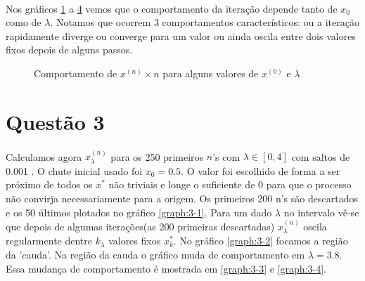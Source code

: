 \documentclass[a4paper,11pt]{article}
\begin{document}
\paragraph{}Nos gráficos \ref{graph:2-2-1} a \ref{graph:2-2-3} vemos que o comportamento da iteração depende tanto de $x_0$ como de $\lambda$. Notamos que ocorrem 3 comportamentos característicos: ou a iteração rapidamente diverge ou converge para um valor ou ainda oscila entre dois valores fixos depois de alguns passos.
\FloatBarrier
\begin{figure}
	\hspace{-3.5 cm}
	\begin{subfigure}[!h]{.4\textwidth}
	
	\caption{}
	\label{graph:2-2-1}	
	\end{subfigure}
	\hspace{3.0 cm}	
	\begin{subfigure}[h]{.4\textwidth}
		
		\caption{}
		\label{graph:2-2-2}	
	\end{subfigure}

	\begin{subfigure}[h]{.4\textwidth}
		
		\caption{}
		\label{graph:2-2-3}	
	\end{subfigure}
	\caption{Comportamento de $x^{(n)} \times n$ para alguns valores de $x^{(0)}$ e $\lambda$}
\end{figure}
\FloatBarrier
\newpage

\section*{Questão 3}
\paragraph{}Calculamos agora $x^{(n)}_\lambda$ para os 250 primeiros $n$'s com $\lambda \in [0, 4]$ com saltos de 0.001 . O chute inicial usado foi $x_0 = 0.5$. O valor foi escolhido de forma a ser próximo de todos os $x^*$ não triviais e longe o suficiente de 0 para que o processo não convirja necessariamente para a origem. Os primeiros 200 n's são descartados e os 50 últimos plotados no gráfico \ref{graph:3-1}. Para um dado $\lambda$ no intervalo vê-se que depois de algumas iterações(as 200 primeiras descartadas) $x^{(n)}_\lambda$ oscila regularmente dentre $k_\lambda$ valores fixos $x^*_k$. No gráfico \ref{graph:3-2} focamos a região da 'cauda'. Na região da cauda o gráfico muda de comportamento em $\lambda = 3.8$. Essa mudança de comportamento é mostrada em \ref{graph:3-3} e \ref{graph:3-4}.
\end{document}
